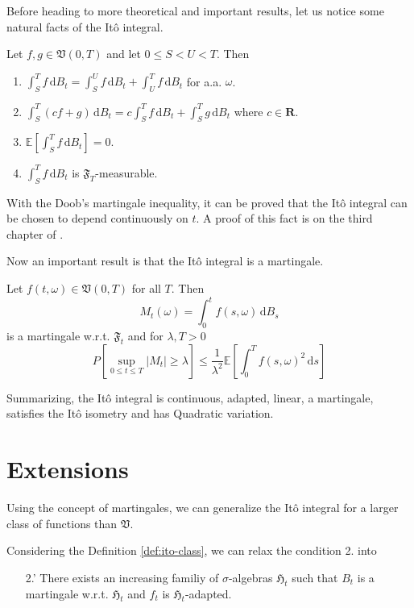 Before heading to more theoretical and important results, let us notice some natural facts of the Itô integral.

\begin{theorem}[]{}{}
	Let $f, g \in \mathfrak{V}(0,T)$ and let $0 \leq S < U < T$. Then
	\begin{enumerate}
		\item $\int_S^T f \, \mathrm{d}B_t = \int_S^U f \, \mathrm{d}B_t + \int_U^T f \, \mathrm{d}B_t$ for a.a. $\omega$.
		\item $\int_S^T (cf + g) \, \mathrm{d}B_t = c \int_S^T f \, \mathrm{d}B_t + \int_S^T g \, \mathrm{d}B_t$ where $c \in \textbf{R}$.
		\item $\mathbb{E} \left[ \int_S^T f \, \mathrm{d}B_t \right] = 0$.
		\item $\int_S^T f \, \mathrm{d}B_t$ is $\mathfrak{F}_T$-measurable.
	\end{enumerate}
\end{theorem}

With the Doob's martingale inequality, it can be proved that the Itô integral can be chosen to depend continuously on $t$. A proof of this fact is on the third chapter of \cite{oksendal2013stochastic}.

Now an important result is that the Itô integral is a martingale.

\begin{theorem}
	Let $f(t, \omega) \in \mathfrak{V}(0,T)$ for all $T$. Then
	\[
		M_t(\omega)  = \int_0^t f(s,\omega)\, \mathrm{d}B_s
	\]
	is a martingale w.r.t. $\mathfrak{F}_t$ and for $\lambda, T > 0$
	\[
		P \left[ \sup_{0 \leq t \leq T} |M_t| \geq \lambda \right] \leq \frac{1}{\lambda^2} \mathbb{E} \left[ \int_0^T f(s,\omega)^2 \, \mathrm{d}s \right]
	\]
\end{theorem}

Summarizing, the Itô integral is continuous, adapted, linear, a martingale, satisfies the Itô isometry and has Quadratic variation.

\section{Extensions}

Using the concept of martingales, we can generalize the Itô integral for a larger class of functions than $\mathfrak{V}$.

Considering the Definition \ref{def:ito-class}, we can relax the condition 2. into
\begin{itemize}
	\item[2.'] There exists an increasing familiy of $\sigma$-algebras $\mathfrak{H}_t$ such that $B_t$ is a martingale w.r.t. $\mathfrak{H}_t$ and $f_t$ is $\mathfrak{H}_t$-adapted.
\end{itemize}

